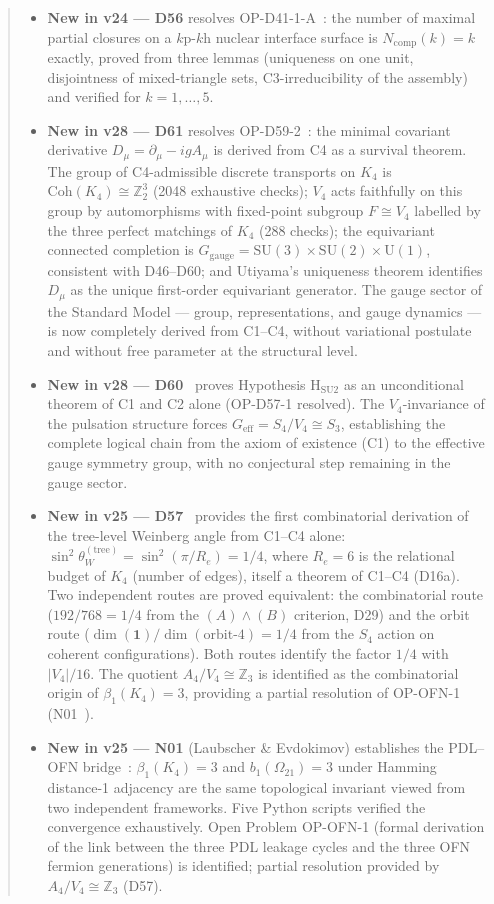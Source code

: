 \documentclass[11pt,a4paper]{article}
\theoremstyle{plain}
\theoremstyle{definition}
\theoremstyle{remark}
\newcommand{\Kfour}{K_4}
\begin{document}
\begin{abstract}
\begin{itemize}
\item \textbf{New in v24 --- D56} resolves OP-D41-1-A~\cite{D56}: the number of maximal partial closures on a $k$p-$k$h nuclear interface surface is $N_{\mathrm{comp}}(k)=k$ exactly, proved from three lemmas (uniqueness on one unit, disjointness of mixed-triangle sets, C3-irreducibility of the assembly) and verified for $k=1,\ldots,5$.
\item \textbf{New in v28 --- D61} resolves OP-D59-2~\cite{D61}: the minimal covariant derivative $D_\mu = \partial_\mu - igA_\mu$ is derived from C4 as a survival theorem. The group of C4-admissible discrete transports on $K_4$ is $\mathrm{Coh}(K_4) \cong \mathbb{Z}_2^3$ (2048 exhaustive checks); $V_4$ acts faithfully on this group by automorphisms with fixed-point subgroup $F \cong V_4$ labelled by the three perfect matchings of $K_4$ (288 checks); the equivariant connected completion is $G_\mathrm{gauge} = \mathrm{SU}(3)\times\mathrm{SU}(2)\times\mathrm{U}(1)$, consistent with D46--D60; and Utiyama's uniqueness theorem identifies $D_\mu$ as the unique first-order equivariant generator. The gauge sector of the Standard Model --- group, representations, and gauge dynamics --- is now completely derived from C1--C4, without variational postulate and without free parameter at the structural level.
\item \textbf{New in v28 --- D60}~\cite{D60} proves Hypothesis H$_{\mathrm{SU2}}$ as an unconditional theorem of C1 and C2 alone (OP-D57-1 resolved). The $V_4$-invariance of the pulsation structure forces $G_{\mathrm{eff}} = S_4/V_4 \cong S_3$, establishing the complete logical chain from the axiom of existence (C1) to the effective gauge symmetry group, with no conjectural step remaining in the gauge sector.
\item \textbf{New in v25 --- D57}~\cite{D57} provides the first combinatorial derivation of the tree-level Weinberg angle from C1--C4 alone: $\sin^2\theta_W^{(\mathrm{tree})} = \sin^2(\pi/R_e) = 1/4$, where $R_e = 6$ is the relational budget of $\Kfour$ (number of edges), itself a theorem of C1--C4 (D16a). Two independent routes are proved equivalent: the combinatorial route ($192/768 = 1/4$ from the $(A)\wedge(B)$ criterion, D29) and the orbit route ($\dim(\mathbf{1})/\dim(\text{orbit-4}) = 1/4$ from the $S_4$ action on coherent configurations). Both routes identify the factor $1/4$ with $|V_4|/16$. The quotient $A_4/V_4 \cong \mathbb{Z}_3$ is identified as the combinatorial origin of $\beta_1(K_4) = 3$, providing a partial resolution of OP-OFN-1 (N01~\cite{N01}).
\item \textbf{New in v25 --- N01} (Laubscher \& Evdokimov) establishes the PDL--OFN bridge~\cite{N01}: $\beta_1(\Kfour)=3$ and $b_1(\Omega_{21})=3$ under Hamming distance-1 adjacency are the same topological invariant viewed from two independent frameworks. Five Python scripts verified the convergence exhaustively. Open Problem OP-OFN-1 (formal derivation of the link between the three PDL leakage cycles and the three OFN fermion generations) is identified; partial resolution provided by $A_4/V_4 \cong \mathbb{Z}_3$ (D57).

\end{itemize}
\end{abstract}
\end{document}
